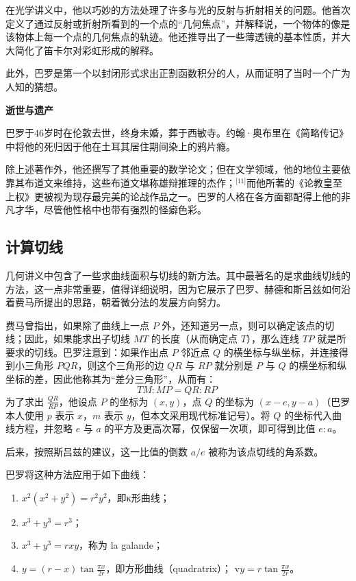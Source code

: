 在光学讲义中，他以巧妙的方法处理了许多与光的反射与折射相关的问题。他首次定义了通过反射或折射所看到的一个点的“几何焦点”，并解释说，一个物体的像是该物体上每一个点的几何焦点的轨迹。他还推导出了一些薄透镜的基本性质，并大大简化了笛卡尔对彩虹形成的解释。

此外，巴罗是第一个以封闭形式求出正割函数积分的人，从而证明了当时一个广为人知的猜想。

\textbf{逝世与遗产}

巴罗于46岁时在伦敦去世，终身未婚，葬于西敏寺。约翰·奥布里在《简略传记》中将他的死归因于他在土耳其居住期间染上的鸦片瘾。

除上述著作外，他还撰写了其他重要的数学论文；但在文学领域，他的地位主要依靠其布道文来维持，这些布道文堪称雄辩推理的杰作；\(^\text{[11]}\)而他所著的《论教皇至上权》更被视为现存最完美的论战作品之一。巴罗的人格在各方面都配得上他的非凡才华，尽管他性格中也带有强烈的怪癖色彩。
\subsection{计算切线}
几何讲义中包含了一些求曲线面积与切线的新方法。其中最著名的是求曲线切线的方法，这一点非常重要，值得详细说明，因为它展示了巴罗、赫德和斯吕兹如何沿着费马所提出的思路，朝着微分法的发展方向努力。

费马曾指出，如果除了曲线上一点 $P$ 外，还知道另一点，则可以确定该点的切线；因此，如果能求出子切线 $MT$ 的长度（从而确定点 $T$），那么连线 $TP$ 就是所要求的切线。巴罗注意到：如果作出点 $P$ 邻近点 $Q$ 的横坐标与纵坐标，并连接得到小三角形 $PQR$，则这个三角形的边 $QR$ 与 $RP$ 就分别是 $P$ 与 $Q$ 的横坐标和纵坐标的差，因此他称其为“差分三角形”，从而有：
$$
TM : MP=QR : RP~
$$
为了求出 $\frac{QR}{RP}$，他设点 $P$ 的坐标为 $(x, y)$，点 $Q$ 的坐标为 $(x - e, y - a)$（巴罗本人使用 $p$ 表示 $x$，$m$ 表示 $y$，但本文采用现代标准记号）。将 $Q$ 的坐标代入曲线方程，并忽略 $e$ 与 $a$ 的平方及更高次幂，仅保留一次项，即可得到比值 $e : a$。

后来，按照斯吕兹的建议，这一比值的倒数 $a/e$ 被称为该点切线的角系数。

巴罗将这种方法应用于如下曲线：

\begin{enumerate}
\item $x^2(x^2 + y^2) = r^2 y^2$，即κ形曲线；
\item $x^3 + y^3 = r^3$；
\item $x^3 + y^3 = rxy$，称为 la galande；
\item $y = (r - x) \tan \frac{\pi x}{2r}$，即方形曲线（quadratrix）；
v$y = r \tan \frac{\pi x}{2r}$。
\end{enumerate}


